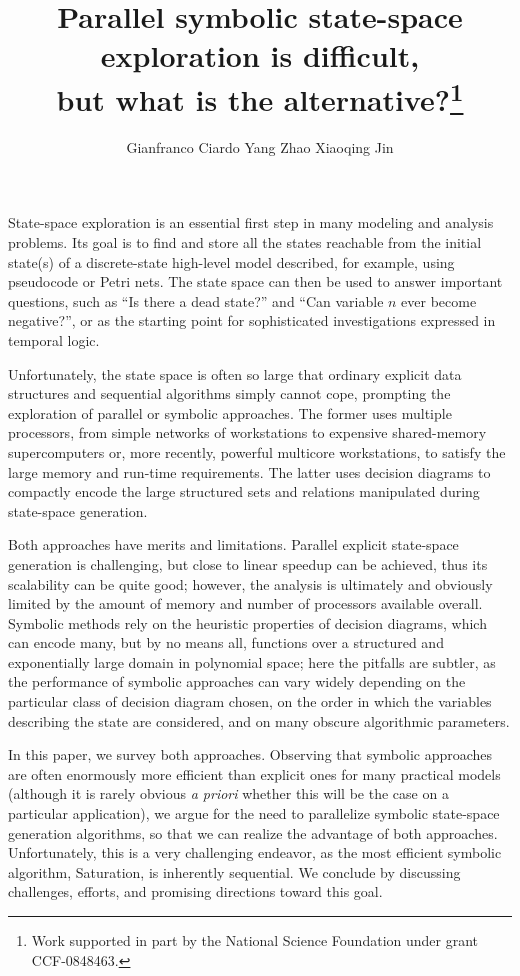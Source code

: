 \documentclass[copyright,creativecommons]{eptcs}
\title{
Parallel symbolic state-space exploration is difficult,\\
but what is the alternative?\thanks{
Work supported in part by the National Science Foundation under
grant CCF-0848463.}
}
\author{
Gianfranco Ciardo
\quad \quad
Yang Zhao
\quad \quad
Xiaoqing Jin
\institute{Department of Computer Science and Engineering\\
           University of California, Riverside}
\email{\{ciardo,zhaoy,jinx\}@cs.ucr.edu}
}
\date{}
\begin{document}
\maketitle

State-space exploration is an essential first step in many modeling and
analysis problems.
Its goal is to find and store all the states reachable from the initial
state(s) of a discrete-state high-level model described, for example,
using pseudocode or Petri nets.
The state space can then be used to answer
important questions, such as ``Is there a dead state?'' and
``Can variable $n$ ever become negative?'', or as the starting point for
sophisticated investigations expressed in temporal logic.

Unfortunately, the state space is often so large that ordinary explicit
data structures and sequential algorithms simply cannot cope, prompting the
exploration of parallel or symbolic approaches.
The former uses multiple processors, from simple
networks of workstations to expensive shared-memory supercomputers or,
more recently, powerful multicore workstations, to satisfy the large
memory and run-time requirements.
The latter uses decision diagrams to compactly encode the large structured
sets and relations manipulated during state-space generation.

Both approaches have merits and limitations.
Parallel explicit state-space generation is challenging, but close
to linear speedup can be achieved, thus its scalability can be quite good;
however, the analysis is ultimately and obviously limited by the amount of
memory and number of processors available overall.
Symbolic methods rely on the heuristic properties of decision diagrams,
which can encode many, but by no means all, functions over a structured and
exponentially large domain in polynomial space;
here the pitfalls are subtler, as the performance of symbolic approaches
can vary widely depending on the particular class of decision diagram chosen,
on the order in which the variables describing the state are considered, and on
many obscure algorithmic parameters.

In this paper, we survey both approaches.
Observing that symbolic approaches
are often enormously more efficient than explicit ones
for many practical models (although it is rarely obvious \emph{a priori}
whether this will be the case on a particular application),
we argue for the need to parallelize symbolic state-space generation
algorithms, so that we can realize the advantage of both approaches.
Unfortunately, this is a very challenging endeavor, as the most
efficient symbolic algorithm, Saturation, is inherently sequential.
We conclude by discussing challenges, efforts, and promising directions
toward this goal.
\end{document}
